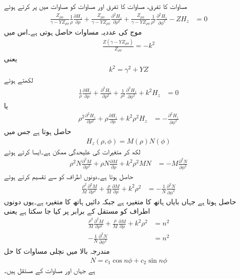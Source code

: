 مساوات  کا  تفرق، مساوات  کا  تفرق اور مساوات  کو مساوات  میں پر کرتے ہوئے
\begin{align}
\frac{Z_{\rho \phi}}{\gamma-YZ_{\rho \phi}}\frac{1}{\rho}\frac{\partial H_z}{\partial \rho}+\frac{Z_{\rho \phi}}{\gamma-YZ_{\rho \phi}}\frac{\partial^2 H_z}{\partial \rho^2}+\frac{Z_{\rho \phi}}{\gamma-YZ_{\rho \phi}} \frac{1}{\rho^2}\frac{\partial^2 H_z}{\partial \phi^2} -Z H_{z}&=0
\end{align}
موج کی عددیہ مساوات حاصل ہوتی ہے۔اس میں
\begin{align}
\frac{Z\left(\gamma-YZ_{\rho \phi}\right)}{Z_{\rho \phi}}=-k^2
\end{align} 
یعنی
\begin{align}\label{مساوات_مویج_ترسیلی_مستقل_الف}
k^2=\gamma^2+YZ
\end{align}
لکھتے ہوئے
\begin{align*}
\frac{1}{\rho}\frac{\partial H_z}{\partial \rho}+\frac{\partial^2 H_z}{\partial \rho^2}+\frac{1}{\rho^2}\frac{\partial^2 H_z}{\partial \phi^2} +k^2 H_{z}&=0
\end{align*}
یا
\begin{align}
\rho^2 \frac{\partial^2 H_z}{\partial \rho^2}+\rho \frac{\partial H_z}{\partial \rho} +k^2 \rho^2 H_{z}&=-\frac{\partial^2 H_z}{\partial \phi^2}
\end{align}
حاصل ہوتا ہے جس میں
\begin{align}\label{مساوات_مویج_نلکی_علیحدگی_مساوات}
H_z(\rho,\phi) =M(\rho) N(\phi)
\end{align}
لکھ کر متغیرات کی علیحدگی ممکن ہے۔ایسا کرتے ہوئے
\begin{align*}
\rho^2 N\frac{\partial^2 M}{\partial \rho^2} +\rho N \frac{\partial M}{\partial \rho} +k^2 \rho^2 M N&=-M \frac{\partial^2 N}{\partial \phi^2}
\end{align*}
حاصل ہوتا ہے۔دونوں اطراف کو  سے تقسیم کرتے ہوئے
\begin{align*}
\frac{\rho^2}{M} \frac{\partial^2 M}{\partial \rho^2} +\frac{\rho}{M} \frac{\partial M}{\partial \rho} +k^2 \rho^2 &=-\frac{1}{N} \frac{\partial^2 N}{\partial \phi^2}
\end{align*}
حاصل ہوتا ہے جہاں بایاں ہاتھ کا متغیرہ  ہے جبکہ دائیں ہاتھ کا متغیرہ  ہے۔یوں دونوں اطراف کو مستقل  کے برابر پر کیا جا سکتا ہے یعنی
\begin{align}
\frac{\rho^2}{M} \frac{\partial^2 M}{\partial \rho^2} +\frac{\rho}{M} \frac{\partial M}{\partial \rho} +k^2 \rho^2 &=n^2\label{مساوات_مویج_نلکی_علیحدہ_مساوات_الف}\\
-\frac{1}{N} \frac{\partial^2 N}{\partial \phi^2}&=n^2
\end{align}
مندرجہ بالا میں نچلی مساوات کا حل
\begin{align}
N=c_1 \cos n \phi +c_2 \sin n \phi
\end{align}
ہے جہاں  اور  مساوات کے مستقل ہیں۔

